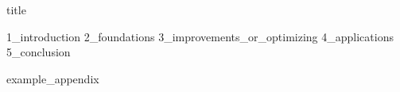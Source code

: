 \documentclass{article}
\begin{document}
{title}

\frontmatter

\begin{abstract}
    {0_abstract}
\end{abstract}
\clearpage


\tableofcontents

\listoffigures
\listoftables

\mainmatter


{1_introduction}
{2_foundations}
{3_improvements_or_optimizing}
{4_applications}
{5_conclusion}

\newpage


\addappendix
{example_appendix}

\end{document}
